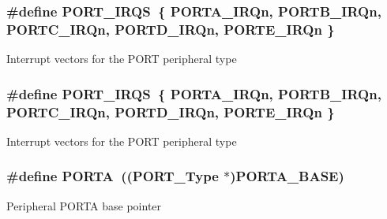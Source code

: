 \subsubsection[{\texorpdfstring{P\+O\+R\+T\+\_\+\+I\+R\+QS}{PORT_IRQS}}]{\setlength{\rightskip}{0pt plus 5cm}\#define P\+O\+R\+T\+\_\+\+I\+R\+QS~\{ {\bf P\+O\+R\+T\+A\+\_\+\+I\+R\+Qn}, {\bf P\+O\+R\+T\+B\+\_\+\+I\+R\+Qn}, {\bf P\+O\+R\+T\+C\+\_\+\+I\+R\+Qn}, {\bf P\+O\+R\+T\+D\+\_\+\+I\+R\+Qn}, {\bf P\+O\+R\+T\+E\+\_\+\+I\+R\+Qn} \}}\hypertarget{group__PORT__Peripheral__Access__Layer_ga442cafa4ce211d588393a5f2954198bb}{}\label{group__PORT__Peripheral__Access__Layer_ga442cafa4ce211d588393a5f2954198bb}
Interrupt vectors for the P\+O\+RT peripheral type 
\subsubsection[{\texorpdfstring{P\+O\+R\+T\+\_\+\+I\+R\+QS}{PORT_IRQS}}]{\setlength{\rightskip}{0pt plus 5cm}\#define P\+O\+R\+T\+\_\+\+I\+R\+QS~\{ {\bf P\+O\+R\+T\+A\+\_\+\+I\+R\+Qn}, {\bf P\+O\+R\+T\+B\+\_\+\+I\+R\+Qn}, {\bf P\+O\+R\+T\+C\+\_\+\+I\+R\+Qn}, {\bf P\+O\+R\+T\+D\+\_\+\+I\+R\+Qn}, {\bf P\+O\+R\+T\+E\+\_\+\+I\+R\+Qn} \}}\hypertarget{group__PORT__Peripheral__Access__Layer_ga442cafa4ce211d588393a5f2954198bb}{}\label{group__PORT__Peripheral__Access__Layer_ga442cafa4ce211d588393a5f2954198bb}
Interrupt vectors for the P\+O\+RT peripheral type 
\subsubsection[{\texorpdfstring{P\+O\+R\+TA}{PORTA}}]{\setlength{\rightskip}{0pt plus 5cm}\#define P\+O\+R\+TA~(({\bf P\+O\+R\+T\+\_\+\+Type} $\ast$){\bf P\+O\+R\+T\+A\+\_\+\+B\+A\+SE})}\hypertarget{group__PORT__Peripheral__Access__Layer_ga7c8a7f98a98d8cb125dd57a66720ab30}{}\label{group__PORT__Peripheral__Access__Layer_ga7c8a7f98a98d8cb125dd57a66720ab30}
Peripheral P\+O\+R\+TA base pointer 
